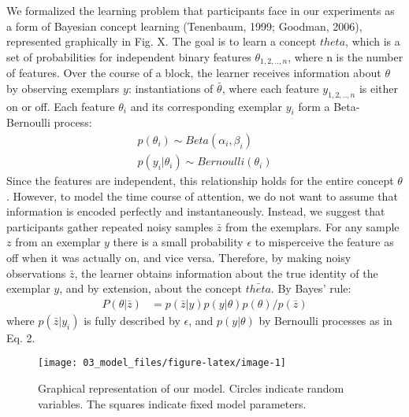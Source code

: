 \documentclass[
]{article}
\author{}
\date{\vspace{-2.5em}}
\begin{document}
We formalized the learning problem that participants face in our
experiments as a form of Bayesian concept learning (Tenenbaum, 1999;
Goodman, 2006), represented graphically in Fig. X. The goal is to learn
a concept \(theta\), which is a set of probabilities for independent
binary features \(\theta_{1,2,..,n}\), where n is the number of
features. Over the course of a block, the learner receives information
about \(\theta\) by observing exemplars \(y\): instantiations of
\(\bar{\theta}\), where each feature \(y_{1,2,..,n}\) is either on or
off. Each feature \(\theta_i\) and its corresponding exemplar \(y_i\)
form a Beta-Bernoulli process: \begin{eqnarray}
p(\theta_i) \sim Beta(\alpha_i,\beta_i) \\
p(y_i|\theta_i) \sim Bernoulli(\theta_i)
\end{eqnarray} Since the features are independent, this relationship
holds for the entire concept \(\theta\). However, to model the time
course of attention, we do not want to assume that information is
encoded perfectly and instantaneously. Instead, we suggest that
participants gather repeated noisy samples \(\bar{z}\) from the
exemplars. For any sample \(z\) from an exemplar \(y\) there is a small
probability \(\epsilon\) to misperceive the feature as off when it was
actually on, and vice versa. Therefore, by making noisy observations
\(\bar{z}\), the learner obtains information about the true identity of
the exemplar \(y\), and by extension, about the concept \(\bar{theta}\).
By Bayes' rule: \begin{eqnarray}
P(\theta|\bar{z}) &= p(\bar{z}|y) p(y|\theta) p(\theta) / p(\bar{z})
\end{eqnarray} where \(p(\bar{z}|y_i)\) is fully described by
\(\epsilon\), and \(p(y|\theta)\) by Bernoulli processes as in Eq. 2.

\begin{figure}[H]

{\centering \texttt{[image: 03\_model\_files/figure-latex/image-1]} 

}

\caption{Graphical representation of our model. Circles indicate random variables. The squares indicate fixed model parameters.}\label{fig:image}
\end{figure}
\end{document}

